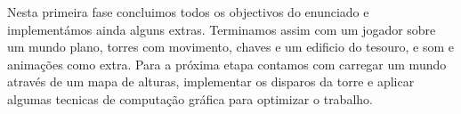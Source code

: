 Nesta primeira fase concluimos todos os objectivos do enunciado e implementámos ainda alguns extras. Terminamos assim com um jogador sobre um mundo plano, torres com movimento, chaves e um edificio do tesouro, e som e animações como extra. Para a próxima etapa contamos com carregar um mundo através de um mapa de alturas, implementar os disparos da torre e aplicar algumas tecnicas de computação gráfica para optimizar o trabalho.
